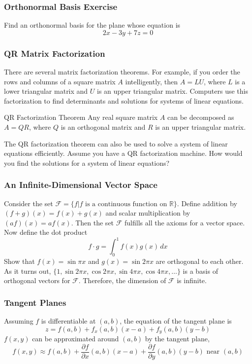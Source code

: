\documentclass[xcolor=dvipsnames]{beamer}
\begin{document}
\begin{frame}
  \frametitle{Orthonormal Basis Exercise}
  {\ubung} Find an orthonormal basis for the plane whose equation is
  \begin{equation}
    \label{eq:deidongo}
    2x-3y+7z=0
  \end{equation}
\end{frame}

\begin{frame}
  \frametitle{QR Matrix Factorization}
  There are several matrix factorization theorems. For example, if you
  order the rows and columns of a square matrix $A$ intelligently,
  then $A=LU$, where $L$ is a lower triangular matrix and $U$ is an
  upper triangular matrix. Computers use this factorization to find
  determinants and solutions for systems of linear equations.
  \begin{block}{QR Factorization Theorem}
    Any real square matrix $A$ can be decomposed as $A=QR$, where $Q$
    is an orthogonal matrix and $R$ is an upper triangular matrix.
  \end{block}
  The QR factorization theorem can also be used to solve a system of
  linear equations efficiently. Assume you have a QR factorization
  machine. How would you find the solutions for a system of linear
  equations?
\end{frame}

\begin{frame}
  \frametitle{An Infinite-Dimensional Vector Space}
  Consider the set $\mathcal{F}=\{f|f\mbox{ is a continuous function
    on }\mathbb{R}\}$. Define addition by $(f+g)(x)=f(x)+g(x)$ and
  scalar multiplication by $(af)(x)=af(x)$. Then the set $\mathcal{F}$
  fulfills all the axioms for a vector space. Now define the dot
  product
  \begin{equation}
    \label{eq:ivaichoh}
    f\cdot{}g=\int_{0}^{1}f(x)g(x)\,dx
  \end{equation}
Show that $f(x)=\sin\pi{}x$ and $g(x)=\sin{}2\pi{}x$ are orthogonal to
each other. As it turns out,
$\{1,\sin{}2\pi{}x,\cos{}2\pi{}x,\sin{}4\pi{}x,\cos{}4\pi{}x,{\ldots}\}$
is a basis of orthogonal vectors for $\mathcal{F}$. Therefore, the
dimension of $\mathcal{F}$ is infinite. 
\end{frame}

\begin{frame}
  \frametitle{Tangent Planes}
  Assuming $f$ is differentiable at $(a,b)$, the equation of the
  tangent plane is
  \begin{equation}
    \label{eq:aoseenai}
z=f(a,b)+f_{x}(a,b)(x-a)+f_{y}(a,b)(y-b)
  \end{equation}
  $f(x,y)$ can be approximated around $(a,b)$ by the tangent plane,
  \begin{equation}
    \label{eq:xabixaic}
    f(x,y)\approx{}f(a,b)+\frac{\partial{}f}{\partial{}x}(a,b)(x-a)+\frac{\partial{}f}{\partial{}y}(a,b)(y-b)\mbox{ near }(a,b)
  \end{equation}
\end{frame}
\end{document}
